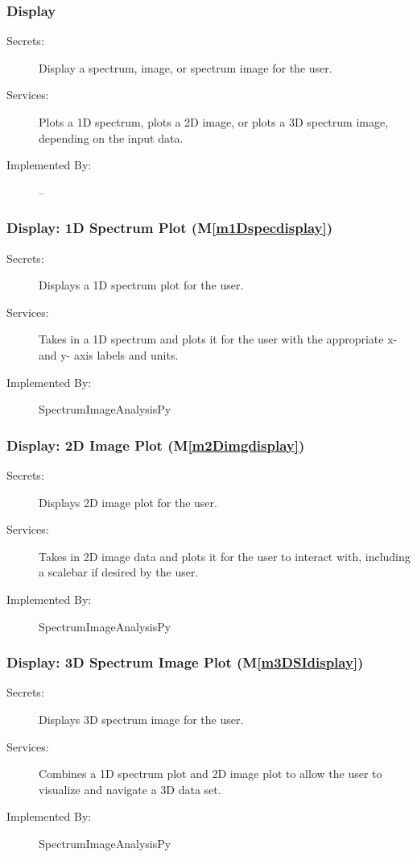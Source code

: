 \documentclass[12pt, titlepage]{article}
\newcommand{\mref}[1]{M\ref{#1}}
\newcommand{\progname}{SpectrumImageAnalysisPy}
\begin{document}
\subsubsection{Display}
\begin{description}
	\item[Secrets:]Display a spectrum, image, or spectrum image for the user.
	\item[Services:]Plots a 1D spectrum, plots a 2D image, or plots a 3D spectrum image, depending on the input data. 
	\item[Implemented By:] --
\end{description}

\subsubsection{Display: 1D Spectrum Plot (\mref{m1Dspecdisplay})}
\begin{description}
	\item[Secrets:]Displays a 1D spectrum plot for the user.
	\item[Services:]Takes in a 1D spectrum and plots it for the user with the appropriate x- and y- axis labels and units.
	\item[Implemented By:] \progname
\end{description}

\subsubsection{Display: 2D Image Plot (\mref{m2Dimgdisplay})}
\begin{description}
	\item[Secrets:]Displays 2D image plot for the user.
	\item[Services:]Takes in 2D image data and plots it for the user to interact with, including a scalebar if desired by the user.
	\item[Implemented By:] \progname
\end{description}

\subsubsection{Display: 3D Spectrum Image Plot (\mref{m3DSIdisplay})}
\begin{description}
	\item[Secrets:]Displays 3D spectrum image for the user.
	\item[Services:]Combines a 1D spectrum plot and 2D image plot to allow the user to visualize and navigate a 3D data set. 
	\item[Implemented By:] \progname
\end{description}
\end{document}
